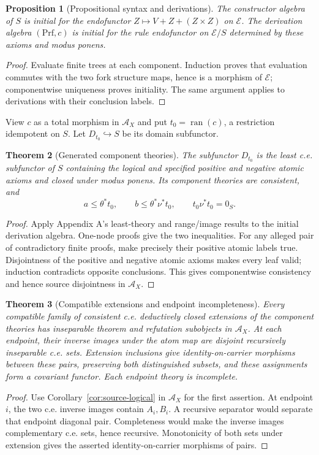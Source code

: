 \documentclass[11pt]{article}
\newtheorem{theorem}{Theorem}[section]
\newtheorem{proposition}[theorem]{Proposition}
\theoremstyle{definition}\newtheorem{definition}[theorem]{Definition}
\newcommand{\ran}{\operatorname{ran}}
\newcommand{\A}{\mathcal A}
\newcommand{\E}{\mathcal E}
\begin{document}
\begin{proposition}[Propositional syntax and derivations]\label{prop:fork-initiality}
The constructor algebra of $S$ is initial for the endofunctor
$Z\mapsto V+Z+(Z\times Z)$ on $\E$. The derivation algebra
$(\mathrm{Prf},c)$ is initial for the rule endofunctor on $\E/S$
determined by these axioms and modus ponens.
\end{proposition}
\begin{proof}
Evaluate finite trees at each component. Induction proves that
evaluation commutes with the two fork structure maps, hence is a
morphism of $\E$; componentwise uniqueness proves initiality.
The same argument applies to derivations with their conclusion
labels.
\end{proof}

View $c$ as a total morphism in $\A_X$ and put $t_0=\ran(c)$,
a restriction idempotent on $S$. Let $D_{t_0}\hookrightarrow S$
be its domain subfunctor.

\begin{theorem}[Generated component theories]\label{thm:fork-generated}
The subfunctor $D_{t_0}$ is the least c.e. subfunctor of $S$
containing the logical and specified positive and negative atomic
axioms and closed under modus ponens. Its component theories are
consistent, and
\[
 a\le\theta^*t_0,\qquad b\le\theta^*\nu^*t_0,
 \qquad t_0\nu^*t_0=0_S.
\]
\end{theorem}
\begin{proof}
Apply Appendix A's least-theory and range/image results to the
initial derivation algebra. One-node proofs give the two
inequalities. For any alleged pair of contradictory finite proofs,
make precisely their positive atomic labels true. Disjointness of
the positive and negative atomic axioms makes every leaf valid;
induction contradicts opposite conclusions. This gives componentwise
consistency and hence source disjointness in $\A_X$.
\end{proof}

\begin{theorem}[Compatible extensions and endpoint incompleteness]\label{thm:fork-extensions}
Every compatible family of consistent c.e. deductively closed
extensions of the component theories has inseparable theorem and
refutation subobjects in $\A_X$. At each endpoint, their inverse
images under the atom map are disjoint recursively inseparable c.e.
sets. Extension inclusions give identity-on-carrier morphisms
between these pairs, preserving both distinguished subsets, and
these assignments form a covariant functor. Each endpoint theory
is incomplete.
\end{theorem}
\begin{proof}
Use Corollary~\ref{cor:source-logical} in $\A_X$ for the first
assertion. At endpoint $i$, the two c.e. inverse images contain
$A_i,B_i$. A recursive separator would separate that endpoint
diagonal pair. Completeness would make the inverse images
complementary c.e. sets, hence recursive. Monotonicity of both
sets under extension gives the asserted identity-on-carrier
morphisms of pairs.
\end{proof}
\end{document}
